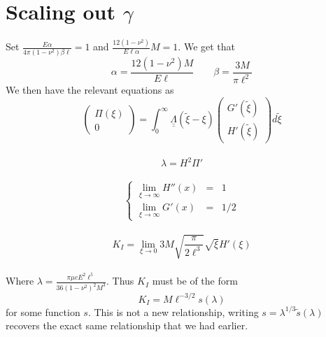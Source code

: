 \documentclass{article}
\begin{document}
\section{Scaling out $\gamma$}
Set $\displaystyle \frac{E\alpha}{4\pi (1-\nu^2)\beta \ell} =1$ 
and $\displaystyle \frac{12(1-\nu^2)}{E \ell \alpha}M=1 $. We get that
\[ \alpha = \frac{12(1-\nu^2)M}{E\ell} \qquad \beta = \frac{3M}{\pi \ell^2} \]
We then have the relevant equations as 
\\
\begin{equation}
 \left( \begin{array}{c} \Pi(\xi) \\ 0 \end{array} \right) =
\int_0^{\infty} 
\underline{\underline{\Lambda}}(\tilde{\xi}- \xi) 
\left( \begin{array}{c} G'(\tilde{\xi}) \\[4pt] H'(\tilde{\xi}) \end{array} 
\right) d\tilde{\xi}
\end{equation}
\\
\begin{equation}
\lambda = H^2 \Pi'
\end{equation}
\\
\begin{equation}
\left\{ \begin{array}{ccc}
\displaystyle \lim_{\xi\to\infty} H''(x) & = & 1 \\
\displaystyle \lim_{\xi\to\infty} G'(x) & = & 1/2  
\end{array} \right.
\end{equation}
\\
\begin{equation}
K_I = \lim_{\xi\to 0} 3M \sqrt{\frac{\pi}{2\ell^3}} 
\sqrt{\xi} H'(\xi)
\end{equation}
\\
Where $\lambda = \frac{\pi \mu c E^2 \ell^5}{36(1-\nu^2)^2 M^3}$. 
Thus $K_I$ must be of the form
\[K_I = M\ell^{-3/2} s(\lambda) \]
for some function $s$. This is not a new relationship, writing 
$s = \lambda^{1/3} \tilde{s}(\lambda)$ recovers the exact same relationship
that we had earlier.
%
%
%
%
%
%
\end{document}
